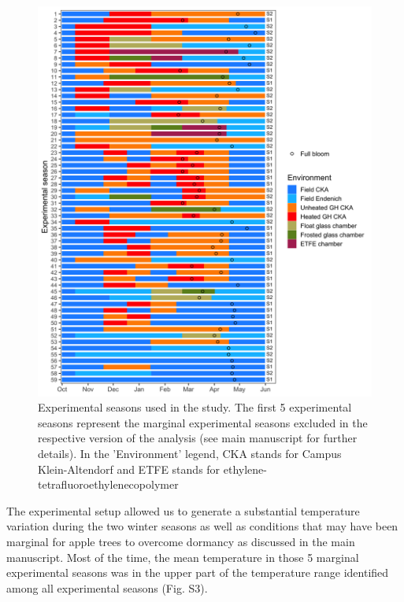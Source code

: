 \documentclass[
]{article}
\begin{document}
\begin{figure}

{\centering \includegraphics[height=0.71\textheight]{figures/supplementary_conditions} 

}

\caption{Experimental seasons used in the study. The first 5 experimental seasons represent the marginal experimental seasons excluded in the respective version of the analysis (see main manuscript for further details). In the 'Environment' legend, CKA stands for Campus Klein-Altendorf and ETFE stands for ethylene-tetrafluoroethylenecopolymer}\label{fig:fig_s2}
\end{figure}

The experimental setup allowed us to generate a substantial temperature
variation during the two winter seasons as well as conditions that may
have been marginal for apple trees to overcome dormancy as discussed in
the main manuscript. Most of the time, the mean temperature in those 5
marginal experimental seasons was in the upper part of the temperature
range identified among all experimental seasons (Fig. S3).

\newpage
\end{document}
